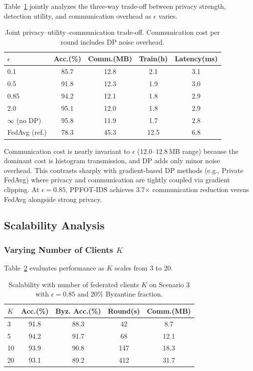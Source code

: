 \documentclass{ieeeaccess}
\theoremstyle{plain}
\theoremstyle{definition}
\theoremstyle{remark}
\begin{document}
Table~\ref{tab:tradeoff} jointly analyzes the three-way trade-off between privacy strength, detection utility, and communication overhead as $\epsilon$ varies.

\begin{table}[!t]
\renewcommand{\arraystretch}{1.2}
\caption{Joint privacy--utility--communication trade-off. Communication cost per round includes DP noise overhead.}
\label{tab:tradeoff}
\centering
\small
\begin{tabular}{lcccc}
\hline
$\epsilon$ & \textbf{Acc.(\%)} & \textbf{Comm.(MB)} & \textbf{Train(h)} & \textbf{Latency(ms)} \\
\hline
0.1 & 85.7 & 12.8 & 2.1 & 3.1 \\
0.5 & 91.8 & 12.3 & 1.9 & 3.0 \\
0.85 & 94.2 & 12.1 & 1.8 & 2.9 \\
2.0 & 95.1 & 12.0 & 1.8 & 2.9 \\
$\infty$ (no DP) & 95.8 & 11.9 & 1.7 & 2.8 \\
\hline
FedAvg (ref.) & 78.3 & 45.3 & 12.5 & 6.8 \\
\hline
\end{tabular}
\end{table}

Communication cost is nearly invariant to $\epsilon$ (12.0--12.8\,MB range) because the dominant cost is histogram transmission, and DP adds only minor noise overhead. This contrasts sharply with gradient-based DP methods (e.g., Private FedAvg) where privacy and communication are tightly coupled via gradient clipping. At $\epsilon = 0.85$, PPFOT-IDS achieves 3.7$\times$ communication reduction versus FedAvg alongside strong privacy.

\subsection{Scalability Analysis}
\label{sec:scalability}

\subsubsection{Varying Number of Clients $K$}

Table~\ref{tab:scalability_K} evaluates performance as $K$ scales from 3 to 20.

\begin{table}[!t]
\renewcommand{\arraystretch}{1.2}
\caption{Scalability with number of federated clients $K$ on Scenario 3 with $\epsilon = 0.85$ and 20\% Byzantine fraction.}
\label{tab:scalability_K}
\centering
\begin{tabular}{lcccc}
\hline
$K$ & \textbf{Acc.(\%)} & \textbf{Byz. Acc.(\%)} & \textbf{Round(s)} & \textbf{Comm.(MB)} \\
\hline
3 & 91.8 & 88.3 & 42 & 8.7 \\
5 & 94.2 & 91.7 & 68 & 12.1 \\
10 & 93.9 & 90.8 & 147 & 18.3 \\
20 & 93.1 & 89.2 & 412 & 31.7 \\
\hline
\end{tabular}
\end{table}
\end{document}
